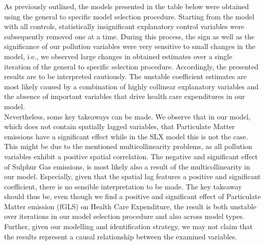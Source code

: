 \documentclass[
]{article}
\begin{document}
	As previously outlined, the models presented in the table below were obtained using the general to specific model selection procedure. Starting from the model with all controls, statistically insignificant explanatory control variables were subsequently removed one at a time. During this process, the sign as well as the significance of our pollution variables were very sensitive to small changes in the model, i.e., we observed large changes in obtained estimates over a single iteration of the general to specific selection procedure. Accordingly, the presented results are to be interpreted cautiously. The unstable coefficient estimates are most likely caused by a combination of highly collinear explanatory variables and the absence of important variables that drive health care expenditures in our model.\\ Nevertheless, some key takeaways can be made. We observe that in our model, which does not contain spatially lagged variables, that Particulate Matter emissions have a significant effect while in the SLX model this is not the case. This might be due to the mentioned multicollinearity problems, as all pollution variables exhibit a positive spatial correlation. The negative and significant effect of Sulphur Gas emissions, is most likely also a result of the multicollinearity in our model. Especially, given that the spatial lag features a positive and significant coefficient, there is no sensible interpretation to be made. The key takeaway should thus be, even though we find a positive and significant effect of Particulate Matter emission (fGLS) on Health Care Expenditure, the result is both unstable over iterations in our model selection procedure and also across model types. Further, given our modelling and identification strategy, we may not claim that the results represent a causal relationship between the examined variables.
\end{document}
